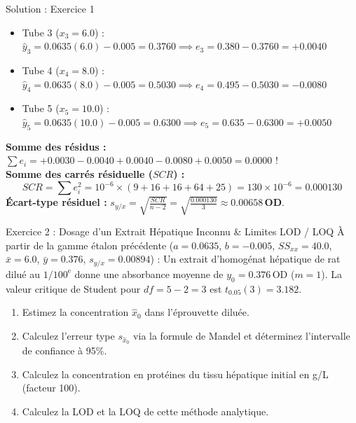 \documentclass[11pt,a4paper]{article}
\begin{document}
\begin{solutionbox}{Solution : Exercice 1}
\begin{enumerate}[label=\textbf{\alph*.}]
\begin{itemize}[leftmargin=*, label=\faAngleRight]
    \item Tube 3 ($x_3=6.0$) : $\hat{y}_3 = 0.0635(6.0) - 0.005 = 0.3760 \implies e_3 = 0.380 - 0.3760 = \mathbf{+0.0040}$
    \item Tube 4 ($x_4=8.0$) : $\hat{y}_4 = 0.0635(8.0) - 0.005 = 0.5030 \implies e_4 = 0.495 - 0.5030 = \mathbf{-0.0080}$
    \item Tube 5 ($x_5=10.0$) : $\hat{y}_5 = 0.0635(10.0) - 0.005 = 0.6300 \implies e_5 = 0.635 - 0.6300 = \mathbf{+0.0050}$
  \end{itemize}
  \textbf{Somme des résidus :} $\sum e_i = +0.0030 - 0.0040 + 0.0040 - 0.0080 + 0.0050 = \mathbf{0.0000}$ !\\
  \textbf{Somme des carrés résiduelle ($SCR$) :}
  \begin{equation*}
    SCR = \sum e_i^2 = 10^{-6} \times (9 + 16 + 16 + 64 + 25) = 130 \times 10^{-6} = \mathbf{0.000130}
  \end{equation*}
  \textbf{Écart-type résiduel :} $s_{y/x} = \sqrt{\frac{SCR}{n - 2}} = \sqrt{\frac{0.000130}{3}} \approx \mathbf{0.00658\,\text{OD}}$.
\end{enumerate}
\end{solutionbox}

\begin{exercicebox}{Exercice 2 : Dosage d'un Extrait Hépatique Inconnu \& Limites LOD / LOQ}
À partir de la gamme étalon précédente ($a = 0.0635$, $b = -0.005$, $SS_{xx} = 40.0$, $\bar{x} = 6.0$, $\bar{y} = 0.376$, $s_{y/x} = 0.00894$) :
Un extrait d'homogénat hépatique de rat dilué au $1/100^{\text{e}}$ donne une absorbance moyenne de $y_0 = 0.376\,\text{OD}$ ($m = 1$).
La valeur critique de Student pour $df = 5 - 2 = 3$ est $t_{0.05}(3) = 3.182$.
\begin{enumerate}[label=\textbf{\alph*.}]
  \item Estimez la concentration $\hat{x}_0$ dans l'éprouvette diluée.
  \item Calculez l'erreur type $s_{\hat{x}_0}$ via la formule de Mandel et déterminez l'intervalle de confiance à 95\%.
  \item Calculez la concentration en protéines du tissu hépatique initial en g/L (facteur 100).
  \item Calculez la LOD et la LOQ de cette méthode analytique.
\end{enumerate}
\end{exercicebox}
\end{document}
